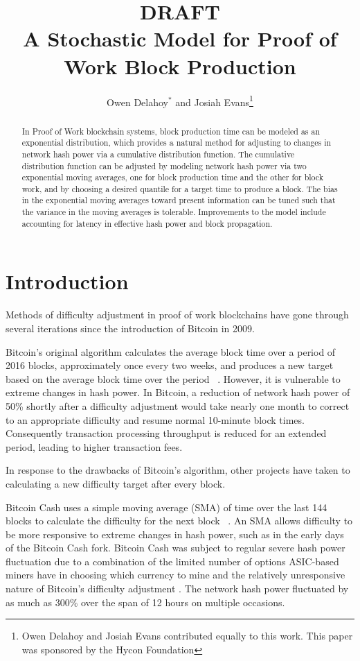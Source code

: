 \documentclass[]{article}
\title{\large DRAFT \\ A Stochastic Model for Proof of Work Block Production}
\author{Owen Delahoy$^*$ and Josiah Evans\footnote{Owen Delahoy and Josiah Evans contributed equally to this work. This paper was sponsored by the Hycon Foundation}}
\begin{document}
\maketitle


\begin{abstract}
In Proof of Work blockchain systems, block production time can be modeled as an exponential distribution, which provides a natural method for adjusting to changes in network hash power via a cumulative distribution function.  The cumulative distribution function can be adjusted by modeling network hash power via two exponential moving averages, one for block production time and the other for block work, and by choosing a desired quantile for a target time to produce a block.  The bias in the exponential moving averages toward present information can be tuned such that the variance in the moving averages is tolerable.  Improvements to the model include accounting for latency in effective hash power and block propagation.     
\end{abstract}

\section{Introduction}
Methods of difficulty adjustment in proof of work blockchains have gone through several iterations since the introduction of Bitcoin in 2009.  
\newline

Bitcoin's original algorithm calculates the average block time over a period of 2016 blocks, approximately once every two weeks, and produces a new target based on the average block time over the period ~\cite{BitcoinRetarget}.  However, it is vulnerable to extreme changes in hash power.  In Bitcoin, a reduction of network hash power of 50\% shortly after a difficulty adjustment would take nearly one month to correct to an appropriate difficulty and resume normal 10-minute block times.  Consequently transaction processing throughput is reduced for an extended period, leading to higher transaction fees.   
\newline

In response to the drawbacks of Bitcoin's algorithm, other projects have taken to calculating a new difficulty target after every block.   
\newline

Bitcoin Cash uses a simple moving average (SMA) of time over the last 144 blocks to calculate the difficulty for the next block ~\cite{Bitcoin-ABC}.  An SMA allows difficulty to be more responsive to extreme changes in hash power, such as in the early days of the Bitcoin Cash fork.  Bitcoin Cash was subject to regular severe hash power fluctuation due to a combination of the limited number of options ASIC-based miners have in choosing which currency to mine and the relatively unresponsive nature of Bitcoin's difficulty adjustment \cite{BitcoinCashMining}.  The network hash power fluctuated by as much as 300\% \cite{BitcoinCashDifficulty} over the span of 12 hours on multiple occasions.   
\newline
\end{document}
